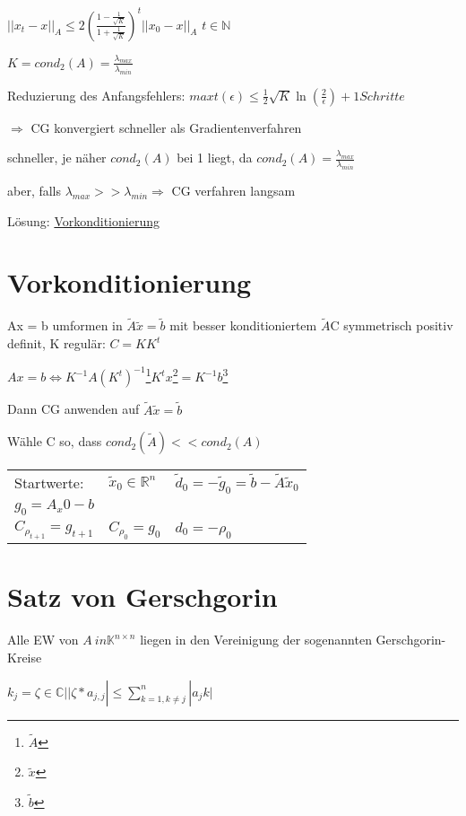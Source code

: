 \documentclass[12pt,a4paper]{article} %
\newcommand*\tab[1][1cm]{\hspace*{#1}}
\begin{document}
	$||x_t - x||_A \le 2 (\frac{1 - \frac{1}{\sqrt{K}}}{1 + \frac{1}{\sqrt{K}}})^t ||x_0 - x||_A$ \tab $t \in \mathbb{N}$
	
	$K = cond_2(A) = \frac{\lambda_{max}}{\lambda_{min}}$
	
	Reduzierung des Anfangsfehlers: $max t(\epsilon) \le \frac{1}{2} \sqrt{K} \ln(\frac{2}{\epsilon}) + 1 Schritte$
	
	$\Rightarrow$ CG konvergiert schneller als Gradientenverfahren
	
	schneller, je näher $cond_2(A)$ bei 1 liegt, da $cond_2(A) = \frac{\lambda_{max}}{\lambda_{min}}$
	
	aber, falls $\lambda_{max} >> \lambda_{min} \Rightarrow$ CG verfahren langsam
	
	Lösung: \underline{Vorkonditionierung}
	
	\newpage
	
	\section{Vorkonditionierung}
	
	Ax = b umformen in $\tilde{A}\tilde{x} = \tilde{b}$ mit besser konditioniertem $\tilde{A}$C symmetrisch positiv definit, K regulär: $C = KK^t$
	
	$Ax = b \Leftrightarrow K^{-1}A(K^t)^{-1}$\footnote{$\tilde{A}$}$K^tx$\footnote{$\tilde{x}$}$ = K^{-1}b$\footnote{$\tilde{b}$}
	
	Dann CG anwenden auf $\tilde{A}\tilde{x} = \tilde{b}$
	
	Wähle C so, dass $cond_2(\tilde{A}) << cond_2(A)$
	
	\begin{tabular}{l l l}
		Startwerte: & $\tilde{x}_0 \in \mathbb{R}^n$ & $\tilde{d}_0 = -\tilde{g}_0 = \tilde{b} - \tilde{A}\tilde{x}_0$ \\
		$g_0 = A_x0 - b$ & & \\
		$C_{\rho_{t + 1}} = g_{t + 1}$ & $C_{\rho_0} = g_0$ & $d_0 = - \rho_0$
	\end{tabular}
	
	\newpage
	
	\section{Satz von Gerschgorin}
	
	Alle EW von $A \ in \mathbb{K}^{n \times n}$ liegen in den Vereinigung der sogenannten Gerschgorin-Kreise
	
	$k_j = {\zeta \in \mathbb{C} | |\zeta * a_{j, j}| \le \sum\limits_{k = 1, k \ne j}^n|a_jk|}$
	
\end{document}
